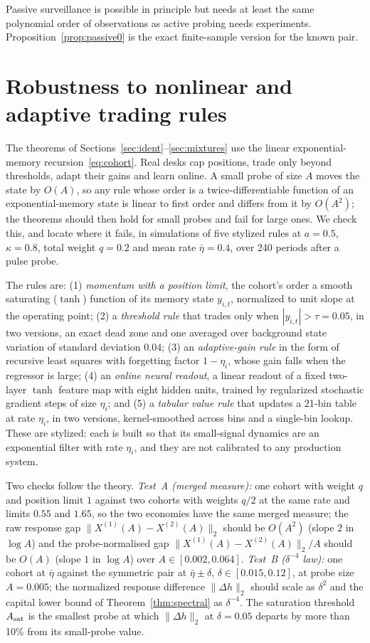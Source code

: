 \documentclass[12pt]{article}
\theoremstyle{definition}
\theoremstyle{remark}
\begin{document}
Passive surveillance is possible in principle but needs at least the same polynomial order of observations as active probing needs experiments. Proposition~\ref{prop:passive0} is the exact finite-sample version for the known pair.

\section{Robustness to nonlinear and adaptive trading rules}\label{sec:learners}

The theorems of Sections~\ref{sec:ident}--\ref{sec:mixtures} use the linear exponential-memory recursion~\eqref{eq:cohort}. Real desks cap positions, trade only beyond thresholds, adapt their gains and learn online. A small probe of size $A$ moves the state by $O(A)$, so any rule whose order is a twice-differentiable function of an exponential-memory state is linear to first order and differs from it by $O(A^2)$; the theorems should then hold for small probes and fail for large ones. We check this, and locate where it fails, in simulations of five stylized rules at $a=0.5$, $\kappa=0.8$, total weight $q=0.2$ and mean rate $\bar\eta=0.4$, over 240 periods after a pulse probe.

The rules are: (1) \emph{momentum with a position limit}, the cohort's order a smooth saturating ($\tanh$) function of its memory state $y_{i,t}$, normalized to unit slope at the operating point; (2) a \emph{threshold rule} that trades only when $|y_{i,t}|>\tau=0.05$, in two versions, an exact dead zone and one averaged over background state variation of standard deviation $0.04$; (3) an \emph{adaptive-gain rule} in the form of recursive least squares with forgetting factor $1-\eta_i$, whose gain falls when the regressor is large; (4) an \emph{online neural readout}, a linear readout of a fixed two-layer $\tanh$ feature map with eight hidden units, trained by regularized stochastic gradient steps of size $\eta_i$; and (5) a \emph{tabular value rule} that updates a 21-bin table at rate $\eta_i$, in two versions, kernel-smoothed across bins and a single-bin lookup. These are stylized: each is built so that its small-signal dynamics are an exponential filter with rate $\eta_i$, and they are not calibrated to any production system.

Two checks follow the theory. \emph{Test~A (merged measure):} one cohort with weight $q$ and position limit $1$ against two cohorts with weights $q/2$ at the same rate and limits $0.55$ and $1.65$, so the two economies have the same merged measure; the raw response gap $\|X^{(1)}(A)-X^{(2)}(A)\|_2$ should be $O(A^2)$ (slope $2$ in $\log A$) and the probe-normalised gap $\|X^{(1)}(A)-X^{(2)}(A)\|_2/A$ should be $O(A)$ (slope $1$ in $\log A$) over $A\in[0.002,0.064]$. \emph{Test~B ($\delta^{-4}$ law):} one cohort at $\bar\eta$ against the symmetric pair at $\bar\eta\pm\delta$, $\delta\in[0.015,0.12]$, at probe size $A=0.005$; the normalized response difference $\|\Delta h\|_2$ should scale as $\delta^2$ and the capital lower bound of Theorem~\ref{thm:spectral} as $\delta^{-4}$. The saturation threshold $A_{\rm sat}$ is the smallest probe at which $\|\Delta h\|_2$ at $\delta=0.05$ departs by more than 10\% from its small-probe value.
\end{document}
